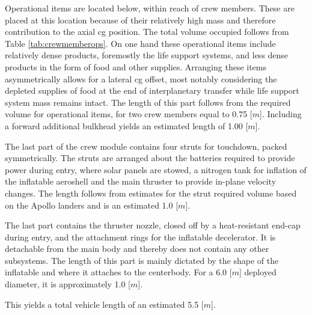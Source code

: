 Operational items are located below, within reach of crew members. These are placed at this location because of their relatively high mass and therefore contribution to the axial \gls{cg} position. The total volume occupied follows from Table \ref{tab:crewmemberops}. On one hand these operational items include relatively dense products, foremostly the life support systems, and less dense products in the form of food and other supplies. Arranging these items asymmetrically allows for a lateral \gls{cg} offset, most notably considering the depleted supplies of food at the end of interplanetary transfer while life support system mass remains intact. The length of this part follows from the required volume for operational items, for two crew members equal to 0.75 [$m$]. Including a forward additional bulkhead yields an estimated length of 1.00 [$m$].

The last part of the crew module contains four struts for touchdown, packed symmetrically. The struts are arranged about the batteries required to provide power during entry, where solar panels are stowed, a nitrogen tank for inflation of the inflatable aeroshell and the main thruster to provide in-plane velocity changes. The length follows from estimates for the strut required volume based on the Apollo landers and is an estimated 1.0 [$m$].

The last part contains the thruster nozzle, closed off by a heat-resistant end-cap during entry, and the attachment rings for the inflatable decelerator. It is detachable from the main body and thereby does not contain any other subsystems. The length of this part is mainly dictated by the shape of the inflatable and where it attaches to the centerbody. For a 6.0 [$m$] deployed diameter, it is approximately 1.0 [$m$].

This yields a total vehicle length of an estimated 5.5 [$m$].

